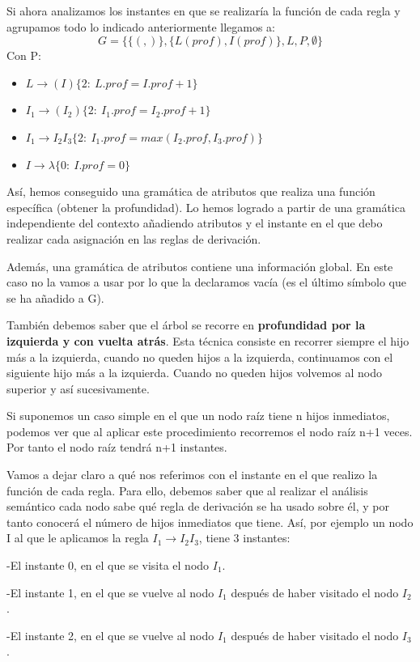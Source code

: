 \documentclass{apuntes}
\begin{document}
\begin{example}
Si ahora analizamos los instantes en que se realizaría la función de cada regla y agrupamos todo lo indicado anteriormente llegamos a:
\[G=\{\{(,)\}, \{L(prof),I(prof)\}, L, P, \emptyset \}\]
Con P:
\begin{itemize}
\item $L \rightarrow (I) \{2: \ L.prof = I.prof+1\}$
\item $I_1 \rightarrow (I_2) \{2: \ I_1.prof=I_2.prof+1\}$
\item $I_1 \rightarrow I_2I_3 \{2: \ I_1.prof = max(I_2.prof, I_3.prof)\}$
\item $I \rightarrow λ \{0: \ I.prof=0\}$
\end{itemize}

Así, hemos conseguido una gramática de atributos que realiza una función específica (obtener la profundidad). Lo hemos logrado a partir de una gramática independiente del contexto añadiendo atributos y el instante en el que debo realizar cada asignación en las reglas de derivación.

Además, una gramática de atributos contiene una información global. En este caso no la vamos a usar por lo que la declaramos vacía (es el último símbolo que se ha añadido a G).

También debemos saber que el árbol se recorre en \textbf{profundidad por la izquierda y con vuelta atrás}. Esta técnica consiste en recorrer siempre el hijo más a la izquierda, cuando no queden hijos a la izquierda, continuamos con el siguiente hijo más a la izquierda. Cuando no queden hijos volvemos al nodo superior y así sucesivamente.

Si suponemos un caso simple en el que un nodo raíz tiene n hijos inmediatos, podemos ver que al aplicar este procedimiento recorremos el nodo raíz n+1 veces. Por tanto el nodo raíz tendrá n+1 instantes.

Vamos a dejar claro a qué nos referimos con el instante en el que realizo la función de cada regla. Para ello, debemos saber que al realizar el análisis semántico cada nodo sabe qué regla de derivación se ha usado sobre él, y por tanto conocerá el número de hijos inmediatos que tiene. Así, por ejemplo un nodo I al que le aplicamos la regla $I_1 \rightarrow I_2 I_3$, tiene 3 instantes:

-El instante 0, en el que se visita el nodo $I_1$.

-El instante 1, en el que se vuelve al nodo $I_1$ después de haber visitado el nodo $I_2$.

-El instante 2, en el que se vuelve al nodo $I_1$ después de haber visitado el nodo $I_3$.


\end{example}
\end{document}
